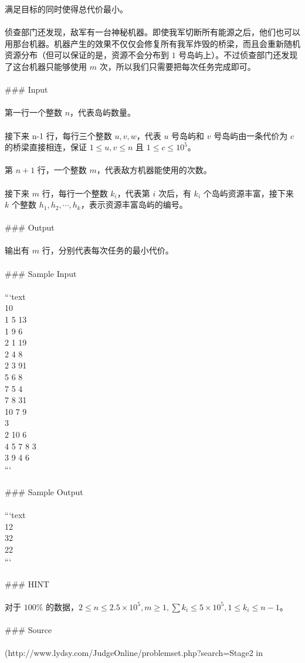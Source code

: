 {满足目标的同时使得总代价最小。\\\\侦查部门还发现，敌军有一台神秘机器。即使我军切断所有能源之后，他们也可以用那台机器。机器产生的效果不仅仅会修复所有我军炸毁的桥梁，而且会重新随机资源分布（但可以保证的是，资源不会分布到 $1$ 号岛屿上）。不过侦查部门还发现了这台机器只能够使用 $m$ 次，所以我们只需要把每次任务完成即可。\\\\### Input\\\\第一行一个整数 $n$，代表岛屿数量。\\\\接下来 n-1 行，每行三个整数 $u,v,w$，代表 $u$ 号岛屿和 $v$ 号岛屿由一条代价为 $c$ 的桥梁直接相连，保证 $1\le u,v\le n$ 且 $1\le c\le 10^5$。\\\\第 $n+1$ 行，一个整数 $m$，代表敌方机器能使用的次数。\\\\接下来 $m$ 行，每行一个整数 $k_i$，代表第 $i$ 次后，有 $k_i$ 个岛屿资源丰富，接下来 $k$ 个整数 $h_1,h_2,\cdots ,h_k$，表示资源丰富岛屿的编号。\\\\### Output\\\\输出有 $m$ 行，分别代表每次任务的最小代价。\\\\### Sample Input\\\\```text\\10\\1 5 13\\1 9 6\\2 1 19\\2 4 8\\2 3 91\\5 6 8\\7 5 4\\7 8 31\\10 7 9\\3\\2 10 6\\4 5 7 8 3\\3 9 4 6\\```\\\\### Sample Output\\\\```text\\12\\32\\22\\```\\\\### HINT\\\\对于 $100\%$ 的数据，$2\le n\le 2.5\times 10^5,m\ge 1,\sum k_i\le 5\times 10^5,1\le k_i\le n-1$。\\\\### Source\\\\[Stage2 day2](http://www.lydsy.com/JudgeOnline/problemset.php?search=Stage2%
 in

}
